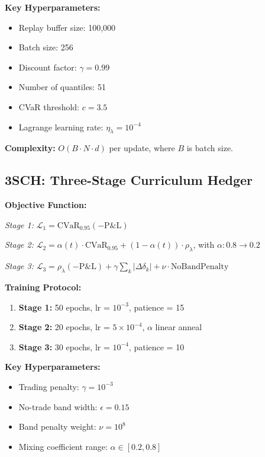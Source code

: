 \textbf{Key Hyperparameters:}
\begin{itemize}[noitemsep]
    \item Replay buffer size: 100,000
    \item Batch size: 256
    \item Discount factor: $\gamma = 0.99$
    \item Number of quantiles: 51
    \item CVaR threshold: $c = 3.5$
    \item Lagrange learning rate: $\eta_\lambda = 10^{-4}$
\end{itemize}

\textbf{Complexity:} $O(B \cdot N \cdot d)$ per update, where $B$ is batch size.

\subsection{3SCH: Three-Stage Curriculum Hedger}

\textbf{Objective Function:}

\textit{Stage 1:} $\mathcal{L}_1 = \text{CVaR}_{0.95}(-\text{P\&L})$

\textit{Stage 2:} $\mathcal{L}_2 = \alpha(t) \cdot \text{CVaR}_{0.95} + (1-\alpha(t)) \cdot \rho_\lambda$, with $\alpha: 0.8 \to 0.2$

\textit{Stage 3:} $\mathcal{L}_3 = \rho_\lambda(-\text{P\&L}) + \gamma \sum_k |\Delta\delta_k| + \nu \cdot \text{NoBandPenalty}$

\textbf{Training Protocol:}
\begin{enumerate}[noitemsep]
    \item \textbf{Stage 1:} 50 epochs, lr = $10^{-3}$, patience = 15
    \item \textbf{Stage 2:} 20 epochs, lr = $5 \times 10^{-4}$, $\alpha$ linear anneal
    \item \textbf{Stage 3:} 30 epochs, lr = $10^{-4}$, patience = 10
\end{enumerate}

\textbf{Key Hyperparameters:}
\begin{itemize}[noitemsep]
    \item Trading penalty: $\gamma = 10^{-3}$
    \item No-trade band width: $\epsilon = 0.15$
    \item Band penalty weight: $\nu = 10^8$
    \item Mixing coefficient range: $\alpha \in [0.2, 0.8]$
\end{itemize}

